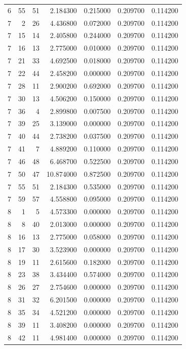 \begin{table}
\begin{tabular}{rrrrrrr}
6 & 55 & 51 & 2.184300 & 0.215000 & 0.209700 & 0.114200 \\
7 & 2 & 26 & 4.436800 & 0.072000 & 0.209700 & 0.114200 \\
7 & 15 & 14 & 2.405800 & 0.244000 & 0.209700 & 0.114200 \\
7 & 16 & 13 & 2.775000 & 0.010000 & 0.209700 & 0.114200 \\
7 & 21 & 33 & 4.692500 & 0.018000 & 0.209700 & 0.114200 \\
7 & 22 & 44 & 2.458200 & 0.000000 & 0.209700 & 0.114200 \\
7 & 28 & 11 & 2.900200 & 0.692000 & 0.209700 & 0.114200 \\
7 & 30 & 13 & 4.506200 & 0.150000 & 0.209700 & 0.114200 \\
7 & 36 & 4 & 2.899800 & 0.007500 & 0.209700 & 0.114200 \\
7 & 39 & 25 & 3.139000 & 0.000000 & 0.209700 & 0.114200 \\
7 & 40 & 44 & 2.738200 & 0.037500 & 0.209700 & 0.114200 \\
7 & 41 & 7 & 4.889200 & 0.110000 & 0.209700 & 0.114200 \\
7 & 46 & 48 & 6.468700 & 0.522500 & 0.209700 & 0.114200 \\
7 & 50 & 47 & 10.874000 & 0.872500 & 0.209700 & 0.114200 \\
7 & 55 & 51 & 2.184300 & 0.535000 & 0.209700 & 0.114200 \\
7 & 59 & 57 & 4.558800 & 0.095000 & 0.209700 & 0.114200 \\
8 & 1 & 5 & 4.573300 & 0.000000 & 0.209700 & 0.114200 \\
8 & 8 & 40 & 2.013000 & 0.000000 & 0.209700 & 0.114200 \\
8 & 16 & 13 & 2.775000 & 0.058000 & 0.209700 & 0.114200 \\
8 & 17 & 30 & 3.523900 & 0.000000 & 0.209700 & 0.114200 \\
8 & 19 & 11 & 2.615600 & 0.182000 & 0.209700 & 0.114200 \\
8 & 23 & 38 & 3.434400 & 0.574000 & 0.209700 & 0.114200 \\
8 & 26 & 27 & 2.754600 & 0.000000 & 0.209700 & 0.114200 \\
8 & 31 & 32 & 6.201500 & 0.000000 & 0.209700 & 0.114200 \\
8 & 35 & 34 & 4.521200 & 0.000000 & 0.209700 & 0.114200 \\
8 & 39 & 11 & 3.408200 & 0.000000 & 0.209700 & 0.114200 \\
8 & 42 & 11 & 4.981400 & 0.000000 & 0.209700 & 0.114200 \\

\end{tabular}
\end{table}
